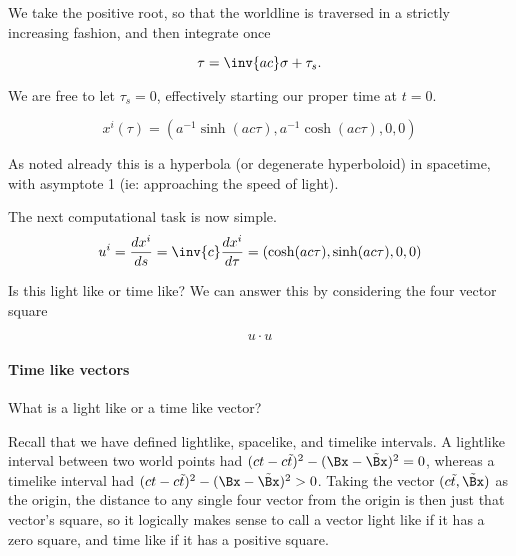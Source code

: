 {We take the positive root, so that the worldline is traversed in a strictly increasing fashion, and then integrate once

\begin{equation}\label{eqn:relativisticElectrodynamicsT2:60}
\tau = \inv{ac} \sigma + \tau_s.
\end{equation}

We are free to let $\tau_s = 0$, effectively starting our proper time at $t=0$.

\begin{equation}\label{eqn:relativisticElectrodynamicsT2:70}
x^i(\tau) = ( a^{-1} \sinh( a c \tau), a^{-1} \cosh( a c \tau ), 0, 0 )
\end{equation}

As noted already this is a hyperbola (or degenerate hyperboloid) in spacetime, with asymptote 1 (ie: approaching the speed of light).



The next computational task is now simple.
\begin{equation}\label{eqn:relativisticElectrodynamicsT2:77}
u^i
= \frac{dx^i}{ds} 
= \inv{c} \frac{dx^i}{d\tau} 
= ( \cosh( a c \tau ), \sinh( a c \tau ), 0, 0) \\
\end{equation}

Is this light like or time like?  We can answer this by considering the four vector square

\begin{equation}\label{eqn:relativisticElectrodynamicsT2:80}
u \cdot u 
\end{equation}

\paragraph{Time like vectors}

What is a light like or a time like vector?

Recall that we have defined lightlike, spacelike, and timelike intervals.  A lightlike interval between two world points had $(ct - c\tilde{t})^2 - (\Bx -\tilde{\Bx})^2 = 0$, whereas a timelike interval had $(ct - c\tilde{t})^2 - (\Bx -\tilde{\Bx})^2 > 0$.  Taking the vector $(c \tilde{t}, \tilde{\Bx})$ as the origin, the distance to any single four vector from the origin is then just that vector's square, so it logically makes sense to call a vector light like if it has a zero square, and time like if it has a positive square.

}

